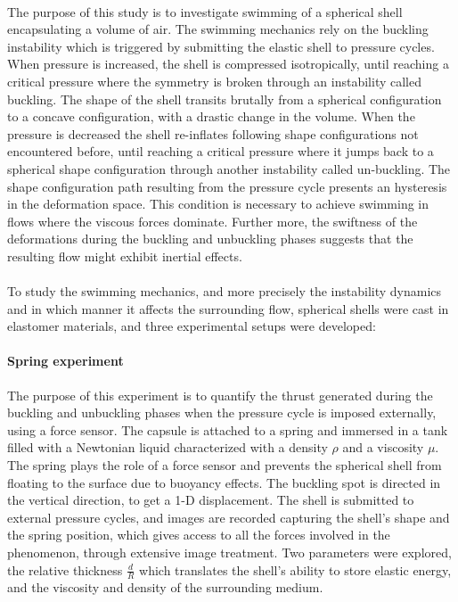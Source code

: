 \paragraph{}
The purpose of this study is to investigate swimming of a spherical shell encapsulating a volume of air. The swimming mechanics rely on the buckling instability which is triggered by submitting the elastic shell to pressure cycles. When pressure is increased, the shell is compressed isotropically, until reaching a critical pressure where the symmetry is broken through an instability called buckling. The shape of the shell transits brutally from a spherical configuration to a concave configuration, with a drastic change in the volume. When the pressure is decreased the shell re-inflates following shape configurations not encountered before, until reaching a critical pressure where it jumps back to a spherical shape configuration through another instability called un-buckling. The shape configuration path resulting from the pressure cycle presents an hysteresis in the deformation space. This condition is necessary to achieve swimming in flows where the viscous forces dominate. Further more, the swiftness of the deformations during the buckling and unbuckling phases suggests that the resulting flow might exhibit inertial effects.
\paragraph{}
To study the swimming mechanics, and more precisely the instability dynamics and in which manner it affects the surrounding flow, spherical shells were cast in elastomer materials, and three experimental setups were developed:

\paragraph{Spring experiment}
The purpose of this experiment is to quantify the thrust generated during the buckling and unbuckling phases when the pressure cycle is imposed externally, using a force sensor. The capsule is attached to a spring and immersed in a tank filled with a Newtonian liquid characterized with a density $\rho$ and a viscosity $\mu$. The spring plays the role of a force sensor and prevents the spherical shell from floating to the surface due to buoyancy effects.  The buckling spot is directed in the vertical direction, to get a 1-D displacement. The shell is submitted to external pressure cycles, and images are recorded capturing the shell's shape and the spring position, which gives access to all the forces involved in the phenomenon, through extensive image treatment. Two parameters were explored, the relative thickness $\frac{d}{R}$ which translates the shell's ability to store elastic energy, and the viscosity and density of the surrounding medium.

